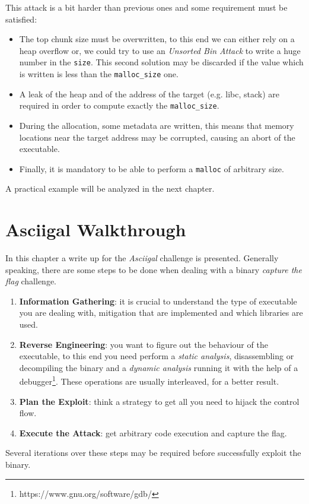 \documentclass{article}
\numberwithin{equation}{subsection}
\begin{document}
This attack is a bit harder than previous ones and some requirement must be satisfied:
\begin{itemize}
    \item The top chunk size must be overwritten, to this end we can either rely on a heap overflow or, we could try to use an \emph{Unsorted Bin Attack} to write a huge number in the \texttt{size}. This second solution may be discarded if the value which is written is less than the \texttt{malloc\_size} one. 
    \item A leak of the heap and of the address of the target (e.g. libc, stack) are  required in order to compute exactly the \texttt{malloc\_size}.
    \item During the allocation, some metadata are written, this means that memory locations near the target address may be corrupted, causing an abort of the executable.
    \item Finally, it is mandatory to be able to perform a \texttt{malloc} of arbitrary size.
\end{itemize}
A practical example will be analyzed in the next chapter.
\section{Asciigal Walkthrough}
In this chapter a write up for the \emph{Asciigal} challenge is presented. Generally speaking, there are some steps to be done when dealing with a binary \emph{capture the flag} challenge.
\begin{enumerate}
    \item \textbf{Information Gathering}: it is crucial to understand the type of executable you are dealing with, mitigation that are implemented and which libraries are used.
    \item \textbf{Reverse Engineering}: you want to figure out the behaviour of the executable, to this end you need perform a \emph{static analysis}, disassembling or decompiling the binary and a \emph{dynamic analysis} running it with the help of a debugger\footnote{https://www.gnu.org/software/gdb/}. These operations are usually interleaved, for a better result.
    \item \textbf{Plan the Exploit}: think a strategy to get all you need to hijack the control flow.
    \item \textbf{Execute the Attack}: get arbitrary code execution and capture the flag.
\end{enumerate}
Several iterations over these steps may be required before successfully exploit the binary.
\end{document}
